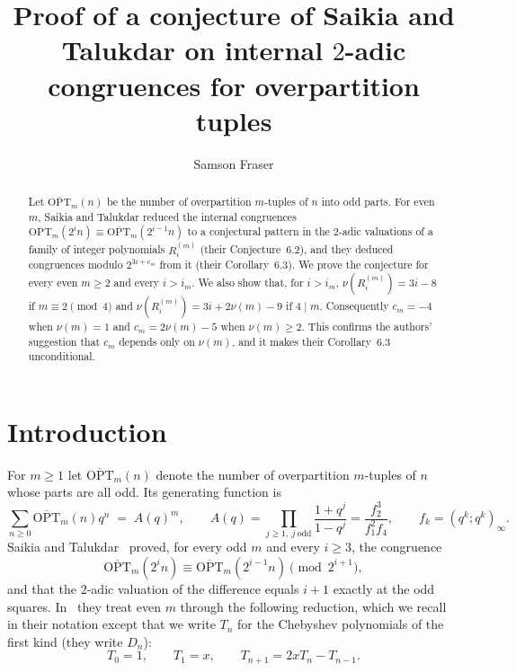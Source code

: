 \documentclass[11pt]{amsart}
\title[Proof of a conjecture of Saikia and Talukdar]{Proof of a conjecture of Saikia and Talukdar on internal $2$-adic congruences for overpartition tuples}
\author{Samson Fraser}
\date{}
\theoremstyle{definition}
\theoremstyle{remark}
\newcommand{\OPT}{\overline{\mathrm{OPT}}}
\begin{document}
\begin{abstract}
Let $\OPT_m(n)$ be the number of overpartition $m$-tuples of $n$ into odd parts. For even $m$, Saikia and Talukdar reduced the internal congruences $\OPT_m(2^in)\equiv\OPT_m(2^{i-1}n)$ to a conjectural pattern in the $2$-adic valuations of a family of integer polynomials $R^{(m)}_i$ (their Conjecture~6.2), and they deduced congruences modulo $2^{3i+c_m}$ from it (their Corollary~6.3). We prove the conjecture for every even $m\ge 2$ and every $i>i_m$. We also show that, for $i>i_m$, $\nu(R^{(m)}_i)=3i-8$ if $m\equiv 2\pmod 4$ and $\nu(R^{(m)}_i)=3i+2\nu(m)-9$ if $4\mid m$. Consequently $c_m=-4$ when $\nu(m)=1$ and $c_m=2\nu(m)-5$ when $\nu(m)\ge 2$. This confirms the authors' suggestion that $c_m$ depends only on $\nu(m)$, and it makes their Corollary~6.3 unconditional.
\end{abstract}
\maketitle

\section{Introduction}

For $m\ge1$ let $\OPT_m(n)$ denote the number of overpartition $m$-tuples of $n$ whose parts are all odd. Its generating function is
\[
  \sum_{n\ge 0}\OPT_m(n)q^n \;=\; A(q)^m,\qquad
  A(q)=\prod_{j\ge1,\ j\ \mathrm{odd}}\frac{1+q^j}{1-q^j}=\frac{f_2^3}{f_1^2f_4},\qquad f_k=(q^k;q^k)_\infty .
\]
Saikia and Talukdar~\cite{ST} proved, for every odd $m$ and every $i\ge3$, the congruence
\[
  \OPT_m(2^in)\equiv\OPT_m(2^{i-1}n)\pmod{2^{i+1}},
\]
and that the $2$-adic valuation of the difference equals $i+1$ exactly at the odd squares. In~\cite[\S6]{ST} they treat even $m$ through the following reduction, which we recall in their notation except that we write $T_n$ for the Chebyshev polynomials of the first kind (they write $D_n$):
\[
  T_0=1,\qquad T_1=x,\qquad T_{n+1}=2xT_n-T_{n-1}.
\]
\end{document}

